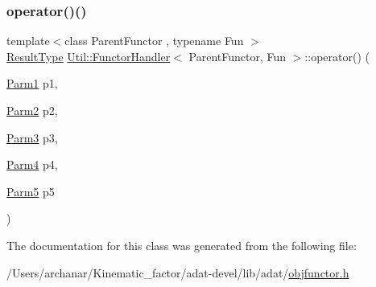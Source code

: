 \subsubsection{\texorpdfstring{operator()()}{operator()()}\hspace{0.1cm}{\footnotesize\ttfamily [18/18]}}
{\footnotesize\ttfamily template$<$class Parent\+Functor , typename Fun $>$ \\
\mbox{\hyperlink{classUtil_1_1FunctorHandler_a036da44b8cc2567704cebd2a20d16c80}{Result\+Type}} \mbox{\hyperlink{classUtil_1_1FunctorHandler}{Util\+::\+Functor\+Handler}}$<$ Parent\+Functor, Fun $>$\+::operator() (\begin{DoxyParamCaption}\item[{\mbox{\hyperlink{classUtil_1_1FunctorHandler_a0a902ba40a0ab746f1c29a81d68ae0db}{Parm1}}}]{p1,  }\item[{\mbox{\hyperlink{classUtil_1_1FunctorHandler_a5fb5374c316f8ac252aa22fcdf7d21a7}{Parm2}}}]{p2,  }\item[{\mbox{\hyperlink{classUtil_1_1FunctorHandler_a25f1b9dd7890c1dbc68abc686f30bec8}{Parm3}}}]{p3,  }\item[{\mbox{\hyperlink{classUtil_1_1FunctorHandler_a2e8ca7556b379684e9b76029e77dd644}{Parm4}}}]{p4,  }\item[{\mbox{\hyperlink{classUtil_1_1FunctorHandler_aeb1492d58534bb15702063e862e459c6}{Parm5}}}]{p5 }\end{DoxyParamCaption})\hspace{0.3cm}{\ttfamily [inline]}}



The documentation for this class was generated from the following file\+:\begin{DoxyCompactItemize}
\item 
/\+Users/archanar/\+Kinematic\+\_\+factor/adat-\/devel/lib/adat/\mbox{\hyperlink{adat-devel_2lib_2adat_2objfunctor_8h}{objfunctor.\+h}}\end{DoxyCompactItemize}
